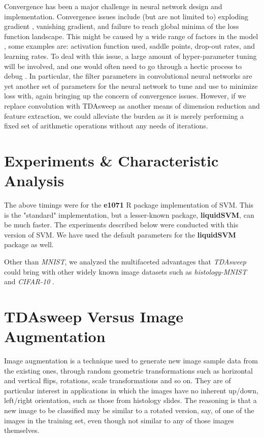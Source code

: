 \documentclass{article}
\begin{document}
Convergence has been a major challenge in neural network design and implementation. Convergence issues include (but are not limited to) exploding gradient \cite{philipp_song_carbonell_2018}, vanishing gradient, and failure to reach global minima of the loss function landscape. This might be caused by a wide range of factors in the model \cite{Pascanu2014}, some examples are: activation function used, saddle points, drop-out rates, and learning rates. To deal with this issue, a large amount of hyper-parameter tuning will be involved, and one would often need to go through a hectic process to debug \cite{fortelny_bock_2019}. In particular, the filter parameters in convolutional neural networks are yet another set of parameters for the neural network to tune and use to minimize loss with, again bringing up the concern of convergence issues. However, if we replace convolution with TDAsweep as another means of dimension reduction and feature extraction, we could alleviate the burden as it is merely performing a fixed set of arithmetic operations without any needs of iterations. 


\section{Experiments \& Characteristic Analysis}
The above timings were for the \textbf{e1071} R package implementation of SVM. This is the "standard" implementation, but a lesser-known package, \textbf{liquidSVM}, can be much faster. The experiments described below were conducted with this version of SVM. We have used the default parameters for the \textbf{liquidSVM} package as well.

Other than \emph{MNIST}, we analyzed the multifaceted advantages that \emph{TDAsweep} could bring with other widely known image datasets such as \emph{histology-MNIST} \cite{kather_weis_bianconi_melchers_schad_gaiser_marx_zöllner_2016} and \emph{CIFAR-10} \cite{Krizhevsky09learningmultiple}.

\section{TDAsweep Versus Image Augmentation}
Image augmentation is a technique used to generate new image sample data from the existing ones, through random geometric transformations such as horizontal and vertical flips, rotations, scale transformations and so on. They are of particular interest in applications in which the images have no inherent up/down, left/right orientation, such as those from histology slides. The reasoning is that a new image to be classified may be similar to a rotated version, say, of one of the images in the training set, even though not similar to any of those images themselves.
\end{document}
